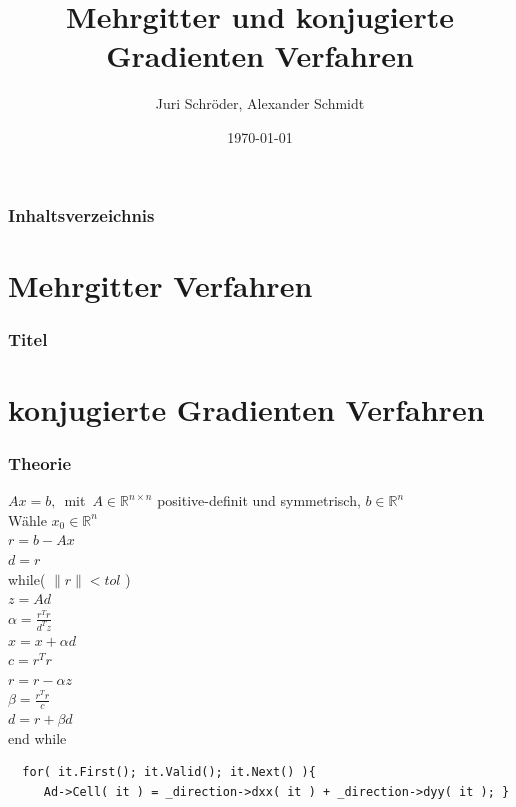 \documentclass[]{beamer}
\title{Mehrgitter und konjugierte Gradienten Verfahren}
\author{Juri Schröder, Alexander Schmidt}
\date{\today}
\begin{document}
\begin{frame}
\titlepage
\end{frame} 

\begin{frame}
\frametitle{Inhaltsverzeichnis}
\tableofcontents
\end{frame} 


\section{Mehrgitter Verfahren}
\begin{frame}
\frametitle{Titel} 
\end{frame}


\section{konjugierte Gradienten Verfahren} 
\begin{frame}
\frametitle{Theorie}
$Ax = b,  $\, mit\, $ A \in \mathbb{R}^{n \times n}$ positive-definit und symmetrisch, $ b \in \mathbb{R}^n$
\\
Wähle $x_0 \in \mathbb{R}^n$
\\
$r = b - A x$
\\
$ d = r$
\\
while( $\| r \| < tol $ )
\\
\hspace*{1cm} $ z = Ad$
\\
\hspace*{1cm} $\alpha = \frac{ r^T r}{d^T z}$
\\
\hspace*{1cm} $x = x + \alpha d$
\\
\hspace*{1cm} $ c = r^T r$
\\
\hspace*{1cm} $r = r - \alpha z$
\\
\hspace*{1cm} $\beta = \frac{ r^T r}{ c }$
\\
\hspace*{1cm} $d = r + \beta d$
\\
end while
\end{frame}

\begin{verbatim}
  for( it.First(); it.Valid(); it.Next() ){
     Ad->Cell( it ) = _direction->dxx( it ) + _direction->dyy( it ); }
\end{verbatim}
\end{document}
